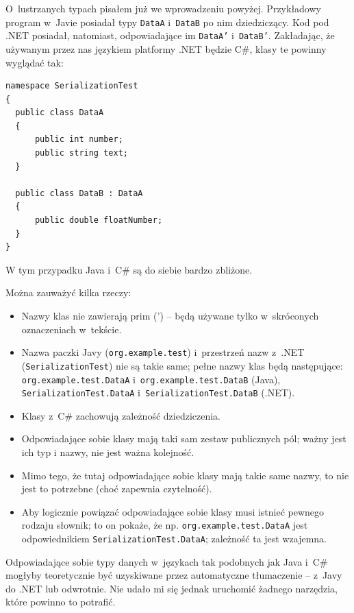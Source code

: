 O~lustrzanych typach pisałem już we wprowadzeniu powyżej. Przykładowy program w~Javie posiadał typy \texttt{DataA} i~\texttt{DataB} po nim dziedziczący. Kod pod .NET posiadał, natomiast, odpowiadające im \texttt{DataA'} i~\texttt{DataB'}.
Zakładając, że używanym przez nas językiem platformy .NET będzie C\#, klasy te powinny wyglądać tak:
\begin{lstlisting}[frame=single]
namespace SerializationTest
{
  public class DataA
  {
      public int number;
      public string text;
  }
  
  public class DataB : DataA
  {
      public double floatNumber;
  }
}
\end{lstlisting}
W tym przypadku Java i~C\# są do siebie bardzo zbliżone.

Można zauważyć kilka rzeczy:
\begin{itemize}
	\item Nazwy klas nie zawierają prim (') -- będą używane tylko w~skróconych oznaczeniach w~tekście.
	\item Nazwa paczki Javy (\texttt{org.example.test}) i~przestrzeń nazw z~.NET (\texttt{SerializationTest}) nie są takie same; pełne nazwy klas będą następujące: \texttt{org.example.test.DataA} i~\texttt{org.example.test.DataB} (Java), \texttt{SerializationTest.DataA} i~\texttt{SerializationTest.DataB} (.NET).
	\item Klasy z~C\# zachowują zależność dziedziczenia.
	\item Odpowiadające sobie klasy mają taki sam zestaw publicznych pól; ważny jest ich typ i nazwy, nie jest ważna kolejność.
	\item Mimo tego, że tutaj odpowiadające sobie klasy mają takie same nazwy, to nie jest to potrzebne (choć zapewnia czytelność).
	\item Aby logicznie powiązać odpowiadające sobie klasy musi istnieć pewnego rodzaju słownik; to on pokaże, że np. \texttt{org.example.test.DataA} jest odpowiednikiem \texttt{SerializationTest.DataA}; zależność ta jest wzajemna.
\end{itemize}


Odpowiadające sobie typy danych w~językach tak podobnych jak Java i~C\# mogłyby teoretycznie być uzyskiwane przez automatyczne tłumaczenie -- z~Javy do .NET lub odwrotnie.
Nie udało mi się jednak uruchomić żadnego narzędzia, które powinno to potrafić.

